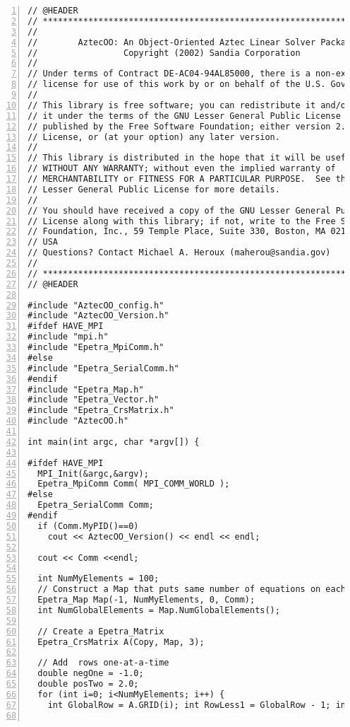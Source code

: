 \begin{Verbatim}[frame=single,numbers=left,fontfamily=courier,fontsize=\tiny]
// @HEADER
// ***********************************************************************
// 
//        AztecOO: An Object-Oriented Aztec Linear Solver Package 
//                 Copyright (2002) Sandia Corporation
// 
// Under terms of Contract DE-AC04-94AL85000, there is a non-exclusive
// license for use of this work by or on behalf of the U.S. Government.
// 
// This library is free software; you can redistribute it and/or modify
// it under the terms of the GNU Lesser General Public License as
// published by the Free Software Foundation; either version 2.1 of the
// License, or (at your option) any later version.
//  
// This library is distributed in the hope that it will be useful, but
// WITHOUT ANY WARRANTY; without even the implied warranty of
// MERCHANTABILITY or FITNESS FOR A PARTICULAR PURPOSE.  See the GNU
// Lesser General Public License for more details.
//  
// You should have received a copy of the GNU Lesser General Public
// License along with this library; if not, write to the Free Software
// Foundation, Inc., 59 Temple Place, Suite 330, Boston, MA 02111-1307
// USA
// Questions? Contact Michael A. Heroux (maherou@sandia.gov) 
// 
// ***********************************************************************
// @HEADER

#include "AztecOO_config.h"
#include "AztecOO_Version.h"
#ifdef HAVE_MPI
#include "mpi.h"
#include "Epetra_MpiComm.h"
#else
#include "Epetra_SerialComm.h"
#endif
#include "Epetra_Map.h"
#include "Epetra_Vector.h"
#include "Epetra_CrsMatrix.h"
#include "AztecOO.h"

int main(int argc, char *argv[]) {

#ifdef HAVE_MPI
  MPI_Init(&argc,&argv);
  Epetra_MpiComm Comm( MPI_COMM_WORLD );
#else
  Epetra_SerialComm Comm;
#endif
  if (Comm.MyPID()==0)
    cout << AztecOO_Version() << endl << endl;

  cout << Comm <<endl;

  int NumMyElements = 100;
  // Construct a Map that puts same number of equations on each processor
  Epetra_Map Map(-1, NumMyElements, 0, Comm);
  int NumGlobalElements = Map.NumGlobalElements();

  // Create a Epetra_Matrix
  Epetra_CrsMatrix A(Copy, Map, 3);
  
  // Add  rows one-at-a-time
  double negOne = -1.0;
  double posTwo = 2.0;
  for (int i=0; i<NumMyElements; i++) {
    int GlobalRow = A.GRID(i); int RowLess1 = GlobalRow - 1; int RowPlus1 = GlobalRow + 1;


\end{Verbatim}

